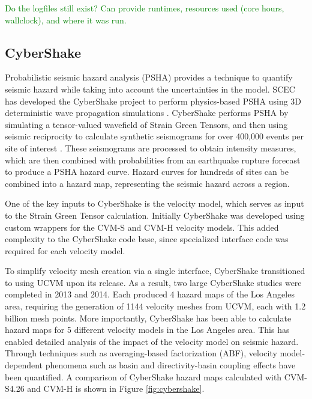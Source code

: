 \textcolor{green}{Do the logfiles still exist? Can provide runtimes, resources used (core hours, wallclock), and where it was run.}



\subsection{CyberShake}

Probabilistic seismic hazard analysis (PSHA) provides a technique to quantify seismic hazard while taking into account the uncertainties in the model.  SCEC has developed the CyberShake project to perform physics-based PSHA using 3D deterministic wave propagation simulations \citep{Graves_2011_PAG}.  CyberShake performs PSHA by simulating a tensor-valued wavefield of Strain Green Tensors, and then using seismic reciprocity to calculate synthetic seismograms for over 400,000 events per site of interest \citep{Zhao_2006_BSSA}.  These seismograms are processed to obtain intensity measures, which are then combined with probabilities from an earthquake rupture forecast to produce a PSHA hazard curve.  Hazard curves for hundreds of sites can be combined into a hazard map, representing the seismic hazard across a region.

One of the key inputs to CyberShake is the velocity model, which serves as input to the Strain Green Tensor calculation.  Initially CyberShake was developed using custom wrappers for the CVM-S and CVM-H velocity models.  This added complexity to the CyberShake code base, since specialized interface code was required for each velocity model.

To simplify velocity mesh creation via a single interface, CyberShake transitioned to using UCVM upon its release. As a result, two large CyberShake studies were completed in 2013 \citep{Callaghan_2013_Proc} and 2014.  Each produced 4 hazard maps of the Los Angeles area, requiring the generation of 1144 velocity meshes from UCVM, each with 1.2 billion mesh points.  More importantly, CyberShake has been able to calculate hazard maps for 5 different velocity models in the Los Angeles area.  This has enabled detailed analysis of the impact of the velocity model on seismic hazard.  Through techniques such as averaging-based factorization (ABF), velocity model-dependent phenomena such as basin and directivity-basin coupling effects have been quantified\citep{Wang_2014_BSSA}.  A comparison of CyberShake hazard maps calculated with CVM-S4.26 and CVM-H is shown in Figure \ref{fig:cybershake}.



